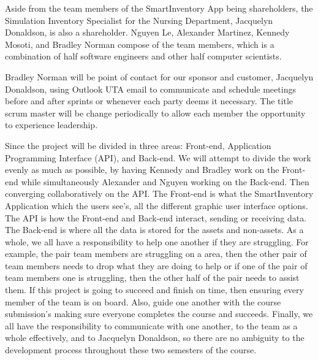 Aside from the team members of the SmartInventory App being shareholders, the Simulation Inventory Specialist for the Nursing Department, Jacquelyn Donaldson, is also a shareholder. Nguyen Le, Alexander Martinez, Kennedy Mosoti, and Bradley Norman compose of the team members, which is a combination of half software engineers and other half computer scientists.

Bradley Norman will be point of contact for our sponsor and customer, Jacquelyn Donaldson, using Outlook UTA email to communicate  and schedule meetings before and after sprints or whenever each party deems it necessary. The title scrum master will be change periodically to allow each member the opportunity to experience leadership.

Since the project will be divided in three areas: Front-end, Application Programming Interface (API), and Back-end. We will attempt to divide the work evenly as much as possible, by having Kennedy and Bradley work on the Front-end while simultaneously Alexander and Nguyen working on the Back-end. Then converging collaboratively on the API. The Front-end is what the SmartInventory Application which the users see's, all the different graphic user interface options. The API is how the Front-end and Back-end interact, sending or receiving data. The Back-end is where all the data is stored for the assets and non-assets. As a whole, we all have a responsibility to help one another if they are struggling. For example, the pair team members are struggling on a area, then the other pair of team members needs to drop what they are doing to help or if one of the pair of team members one is struggling, then the other half of the pair needs to assist them. If this project is going to succeed and finish on time, then ensuring every member of the team is on board. Also, guide one another with the course submission's making sure everyone completes the course and succeeds. Finally, we all have the responsibility to communicate with one another, to the team as a whole effectively, and to Jacquelyn Donaldson, so there are no ambiguity to the development process throughout these two semesters of the course.